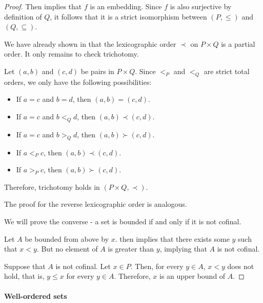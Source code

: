 \begin{proof}
  Then  implies that \( f \) is an embedding. Since \( f \) is also surjective by definition of \( Q \), it follows that it is a strict isomorphism between \( (P, \leq) \) and \( (Q, \subseteq) \).

   We have already shown in  that the lexicographic order \( \prec \) on \( P \times Q \) is a partial order. It only remains to check trichotomy.

  Let \( (a, b) \) and \( (c, d) \) be pairs in \( P \times Q \). Since \( <_P \) and \( <_Q \) are strict total orders, we only have the following possibilities:
  \begin{itemize}
    \item If \( a = c \) and \( b = d \), then \( (a, b) = (c, d) \).
    \item If \( a = c \) and \( b <_Q d \), then \( (a, b) \prec (c, d) \).
    \item If \( a = c \) and \( b >_Q d \), then \( (a, b) \succ (c, d) \).
    \item If \( a <_P c \), then \( (a, b) \prec (c, d) \).
    \item If \( a >_P c \), then \( (a, b) \succ (c, d) \).
  \end{itemize}

  Therefore, trichotomy holds in \( (P \times Q, \prec) \).

  The proof for the reverse lexicographic order is analogous.

   We will prove the converse - a set is bounded if and only if it is not cofinal.

  \SufficiencySubProof* Let \( A \) be bounded from above by \( x \).  then implies that there exists some \( y \) such that \( x < y \). But no element of \( A \) is greater than \( y \), implying that \( A \) is not cofinal.

  \NecessitySubProof* Suppose that \( A \) is not cofinal. Let \( x \in P \). Then, for every \( y \in A \), \( x < y \) does not hold, that is, \( y \leq x \) for every \( y \in A \). Therefore, \( x \) is an upper bound of \( A \).
\end{proof}

\paragraph{Well-ordered sets}

